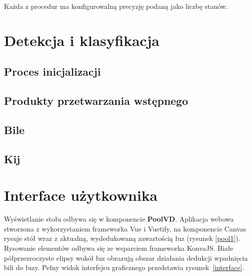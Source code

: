 \documentclass[12pt]{article}
\begin{document}
Każda z procedur ma konfigurowalną precyzję podaną jako liczbę stanów.

\section{Detekcja i klasyfikacja}


\subsection{Proces inicjalizacji}

\subsection{Produkty przetwarzania wstępnego}

\subsection{Bile}
\subsection{Kij}


\section{Interface użytkownika}

Wyświetlanie stołu odbywa się w komponencie \textbf{PoolVD}. Aplikacja webowa stworzona z wykorzystaniem frameworka Vue i Vuetify, na komponencie Canvas rysuje stół wraz z aktualną, wydedukowaną zawartością łuz (rysunek \ref{pool1}). Rysowanie elementów odbywa się ze wsparciem frameworka KonvaJS\cite{konva}. Białe półprzezroczyste elipsy wokół łuz obrazują obszar działania dedukcji wpadnięcia bili do łuzy. Pełny widok interfejsu graficznego przedstawia rysunek~\ref{interface}.
\end{document}
